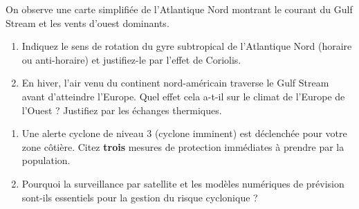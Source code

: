 \documentclass[11pt]{article}
\begin{document}
\begin{exercice}
On observe une carte simplifiée de l'Atlantique Nord montrant le courant du Gulf Stream et les vents d'ouest dominants.
\begin{enumerate}
    \item Indiquez le sens de rotation du gyre subtropical de l'Atlantique Nord (horaire ou anti-horaire) et justifiez-le par l'effet de Coriolis.
    \item En hiver, l'air venu du continent nord-américain traverse le Gulf Stream avant d'atteindre l'Europe. Quel effet cela a-t-il sur le climat de l'Europe de l'Ouest ? Justifiez par les échanges thermiques.
\end{enumerate}
\end{exercice}

\begin{exercice}
\begin{enumerate}
    \item Une alerte cyclone de niveau 3 (cyclone imminent) est déclenchée pour votre zone côtière. Citez \textbf{trois} mesures de protection immédiates à prendre par la population.
    \item Pourquoi la surveillance par satellite et les modèles numériques de prévision sont-ils essentiels pour la gestion du risque cyclonique ?
\end{enumerate}
\end{exercice}
\end{document}
